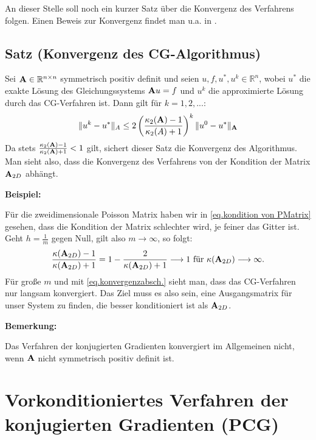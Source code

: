 An dieser Stelle soll noch ein kurzer Satz über die Konvergenz des Verfahrens folgen. Einen Beweis zur Konvergenz findet man u.a. in \cite{GL96}.

\subsection{Satz (Konvergenz des CG-Algorithmus)}\label{ss.Konvergenz CG}

Sei ${\textbf{A}} \in \mathbb{R}^{n \times n}$ symmetrisch positiv definit und seien $u,f,u^{*},u^{k} \in \mathbb{R}^{n}$, wobei $u^{*}$ die exakte Lösung des Gleichungssystems ${\textbf{A}}u = f$ und $u^{k}$ die approximierte Lösung durch das CG-Verfahren ist. Dann gilt für $k = 1,2,...$:
\begin{equation}
\| u^{k} - u^{*} \|_{A} \le 2 \left( \frac {\kappa_{2} ({\textbf{A}}) - 1} {\kappa_{2} (A) + 1} \right)^{k} \| u^{0} - u^{*} \|_{{\textbf{A}}} \label{eq.konvergenzabsch.}
\end{equation}
Da stets $\frac {\kappa_{2} ({\textbf{A}}) - 1} {\kappa_{2} ({\textbf{A}}) + 1} < 1$ gilt, sichert dieser Satz die Konvergenz des Algorithmus. Man sieht also, dass die Konvergenz des Verfahrens von der Kondition der Matrix ${\textbf{A}}_{2D}$ abhängt.

\textbf{Beispiel:}

Für die zweidimensionale Poisson Matrix haben wir in \autoref{eq.kondition von PMatrix} gesehen, dass die Kondition der Matrix schlechter wird, je feiner das Gitter ist. Geht $h = \frac{1}{m}$ gegen Null, gilt also $m \longrightarrow \infty$, so folgt:
\begin{equation}
  \frac {\kappa({\textbf{A}}_{2D}) - 1} {\kappa({\textbf{A}}_{2D}) + 1} = 1 - \frac {2} {\kappa({\textbf{A}}_{2D}) + 1} \longrightarrow 1 \textnormal{ für } \kappa({\textbf{A}}_{2D}) \longrightarrow \infty.
\end{equation}
Für große $m$ und mit \autoref{eq.konvergenzabsch.} sieht man, dass das CG-Verfahren nur langsam konvergiert. Das Ziel muss es also sein, eine Ausgangsmatrix für unser System zu finden, die besser konditioniert ist als ${\textbf{A}}_{2D}$. 

\textbf{Bemerkung:}

Das Verfahren der konjugierten Gradienten konvergiert im Allgemeinen nicht, wenn ${\textbf{A}}$ nicht symmetrisch positiv definit ist.

\section{Vorkonditioniertes Verfahren der konjugierten Gradienten (PCG)}\label{s.PCG}

